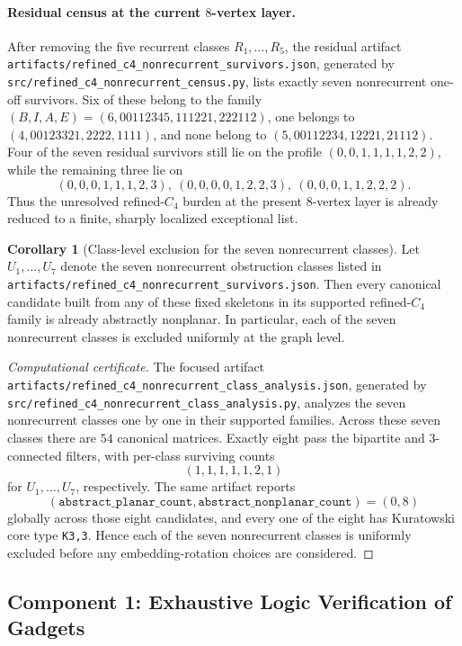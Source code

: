 \documentclass[12pt]{article}
\theoremstyle{definition}
\newtheorem{corollary}[theorem]{Corollary}
\begin{document}
\paragraph{Residual census at the current $8$-vertex layer.}
After removing the five recurrent classes $R_1,\dots,R_5$, the residual artifact \texttt{artifacts/refined\_c4\_nonrecurrent\_survivors.json}, generated by \texttt{src/refined\_c4\_nonrecurrent\_census.py}, lists exactly seven nonrecurrent one-off survivors. Six of these belong to the family $(B,I,A,E)=(6,00112345,111221,222112)$, one belongs to $(4,00123321,2222,1111)$, and none belong to $(5,00112234,12221,21112)$. Four of the seven residual survivors still lie on the profile $(0,0,1,1,1,1,2,2)$, while the remaining three lie on
\[
(0,0,0,1,1,1,2,3),\ (0,0,0,0,1,2,2,3),\ (0,0,0,1,1,2,2,2).
\]
Thus the unresolved refined-$C_4$ burden at the present $8$-vertex layer is already reduced to a finite, sharply localized exceptional list.

\begin{corollary}[Class-level exclusion for the seven nonrecurrent classes]
Let $U_1,\dots,U_7$ denote the seven nonrecurrent obstruction classes listed in \texttt{artifacts/refined\_c4\_nonrecurrent\_survivors.json}. Then every canonical candidate built from any of these fixed skeletons in its supported refined-$C_4$ family is already abstractly nonplanar. In particular, each of the seven nonrecurrent classes is excluded uniformly at the graph level.
\end{corollary}

\begin{proof}[Computational certificate]
The focused artifact \texttt{artifacts/refined\_c4\_nonrecurrent\_class\_analysis.json}, generated by \texttt{src/refined\_c4\_nonrecurrent\_class\_analysis.py}, analyzes the seven nonrecurrent classes one by one in their supported families. Across these seven classes there are $54$ canonical matrices. Exactly eight pass the bipartite and $3$-connected filters, with per-class surviving counts
\[
(1,1,1,1,1,2,1)
\]
for $U_1,\dots,U_7$, respectively. The same artifact reports
\[
(\texttt{abstract\_planar\_count},\texttt{abstract\_nonplanar\_count})=(0,8)
\]
globally across those eight candidates, and every one of the eight has Kuratowski core type \texttt{K3,3}. Hence each of the seven nonrecurrent classes is uniformly excluded before any embedding-rotation choices are considered.
\end{proof}

\subsection{Component 1: Exhaustive Logic Verification of Gadgets}
\label{subsec:logic-verification}
\end{document}

